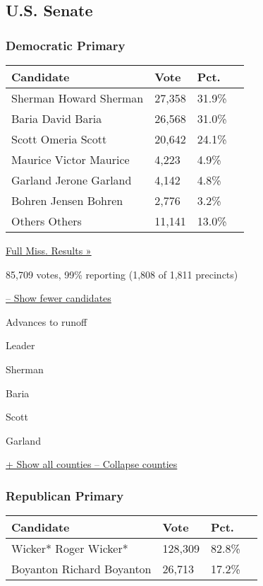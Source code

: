 \hypertarget{us-senate}{%
\subsection{U.S. Senate}\label{us-senate}}

\hypertarget{democratic-primary}{%
\subsubsection{Democratic Primary}\label{democratic-primary}}

\begin{longtable}[]{@{}llll@{}}
\toprule
Candidate & Vote & Pct. &\tabularnewline
\midrule
\endhead
 Sherman Howard Sherman & 27,358 & 31.9\% &\tabularnewline
 Baria David Baria & 26,568 & 31.0\% &\tabularnewline
 Scott Omeria Scott & 20,642 & 24.1\% &\tabularnewline
 Maurice Victor Maurice & 4,223 & 4.9\% &\tabularnewline
 Garland Jerone Garland & 4,142 & 4.8\% &\tabularnewline
 Bohren Jensen Bohren & 2,776 & 3.2\% &\tabularnewline
 Others Others & 11,141 & 13.0\% &\tabularnewline
\bottomrule
\end{longtable}

\href{https://www.nytimes3xbfgragh.onion/elections/results/mississippi}{Full
Miss. Results »}

85,709 votes, 99\% reporting (1,808 of 1,811 precincts)

\protect\hyperlink{}{-- Show fewer candidates}

 Advances to runoff

Leader

 Sherman

 Baria

 Scott

 Garland

\protect\hyperlink{}{+ Show all counties -- Collapse counties}

\hypertarget{republican-primary}{%
\subsubsection{Republican Primary}\label{republican-primary}}

\begin{longtable}[]{@{}llll@{}}
\toprule
Candidate & Vote & Pct. &\tabularnewline
\midrule
\endhead
 Wicker* Roger Wicker* & 128,309 & 82.8\% &\tabularnewline
 Boyanton Richard Boyanton & 26,713 & 17.2\% &\tabularnewline
\bottomrule
\end{longtable}


